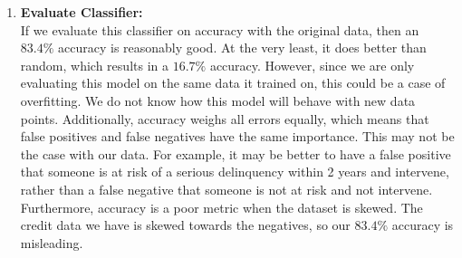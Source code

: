 \documentclass[letterpaper,12pt]{article}
\begin{document}
\begin{enumerate}
\item \textbf{Evaluate Classifier:} \\
If we evaluate this classifier on accuracy with the original data, then an $83.4\%$ accuracy is reasonably good. At the very least, it does better than random, which results in a $16.7\%$ accuracy. However, since we are only evaluating this model on the same data it trained on, this could be a case of overfitting. We do not know how this model will behave with new data points. Additionally, accuracy weighs all errors equally, which means that false positives and false negatives have the same importance. This may not be the case with our data. For example, it may be better to have a false positive that someone is at risk of a serious delinquency within 2 years and intervene, rather than a false negative that someone is not at risk and not intervene. Furthermore, accuracy is a poor metric when the dataset is skewed. The credit data we have is skewed towards the negatives, so our $83.4 \%$ accuracy is misleading. 
\end{enumerate}
\end{document}
